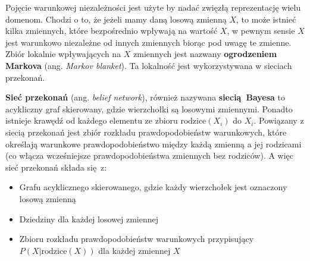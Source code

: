 \documentclass[a4paper, 12pt,oneside]{book}
\begin{document}
Pojęcie warunkowej niezależności jest użyte by nadać zwięzłą reprezentację
wielu domenom. Chodzi o to, że jeżeli mamy daną losową zmienną $X$, to może
istnieć kilka zmiennych, które bezpośrednio wpływają na wartość $X$, w pewnym
sensie $X$ jest warunkowo niezależne od innych zmiennych biorąc pod uwagę te
zmienne. Zbiór lokalnie wpływających na $X$ zmiennych jest nazwany
\textbf{ogrodzeniem Markova} (ang. \textit{Markov blanket}). Ta lokalność
jest wykorzystywana w sieciach przekonań\cite{ai_foundations_belief_networks}.

\textbf{Sieć przekonań} (ang. \textit{belief network}), również nazywana
\textbf{siecią Bayesa} to acykliczny graf skierowany, gdzie wierzchołki są
losowymi zmiennymi. Ponadto istnieje krawędź od każdego elementu ze zbioru
$\text{rodzice}(X_i)$ do $X_i$. Powiązany z siecią przekonań jest zbiór
rozkładu prawdopodobieństw warunkowych, które określają warunkowe
prawdopodobieństwo między każdą zmienną a jej rodzicami (co włącza wcześniejsze
prawdopodobieństwa zmiennych bez rodziców). A więc sieć przekonań składa się z:
\begin{itemize}
	\setlength\itemsep{-0.4em}
\item Grafu acyklicznego skierowanego, gdzie każdy wierzchołek jest oznaczony
	losową zmienną
\item Dziedziny dla każdej losowej zmiennej
\item Zbioru rozkładu prawdopodobieństw warunkowych przypisujący
	$P(X|\text{rodzice}(X))$ dla każdej zmiennej $X$
\end{itemize}
\end{document}
